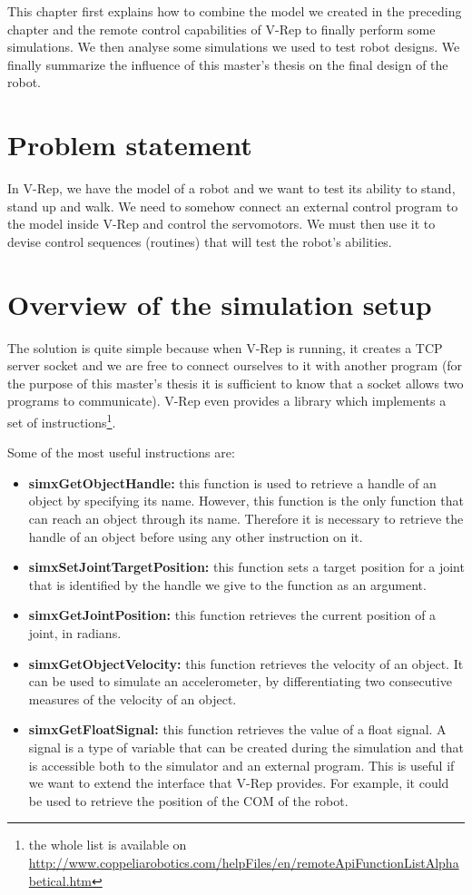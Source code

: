 This chapter first explains how to combine the model we created in the preceding chapter and the remote control capabilities of V-Rep to finally perform some simulations. We then analyse some simulations we used to test robot designs. We finally summarize the influence of this master's thesis on the final design of the robot.

\section{Problem statement}
In V-Rep, we have the model of a robot and we want to test its ability to stand, stand up and walk. We need to somehow connect an external control program to the model inside V-Rep and control the servomotors. We must then use it to devise control sequences (routines) that will test the robot's abilities.

\section{Overview of the simulation setup}
The solution is quite simple because when V-Rep is running, it creates a TCP server socket and we are free to connect ourselves to it with another program (for the purpose of this master's thesis it is sufficient to know that a socket allows two programs to communicate). V-Rep even provides a library which implements a set of instructions\footnote{the whole list is available on \url{http://www.coppeliarobotics.com/helpFiles/en/remoteApiFunctionListAlphabetical.htm}}. 

Some of the most useful instructions are:\begin{itemize}
	\item \textbf{simxGetObjectHandle:} this function is used to retrieve a handle of an object by specifying its name. However, this function is the only function that can reach an object through its name. Therefore it is necessary to retrieve the handle of an object before using any other instruction on it.
	\item \textbf{simxSetJointTargetPosition:} this function sets a target position for a joint that is identified by the handle we give to the function as an argument.
	\item \textbf{simxGetJointPosition:} this function retrieves the current position of a joint, in radians.
	\item \textbf{simxGetObjectVelocity:} this function retrieves the velocity of an object. It can be used to simulate an accelerometer, by differentiating two consecutive measures of the velocity of an object. 
	\item \textbf{simxGetFloatSignal:} this function retrieves the value of a float signal.  A signal is a type of variable that can be created during the simulation and that is accessible both to the simulator and an external program. This is useful if we want to extend the interface that V-Rep provides.  For example, it could be used to retrieve the position of the COM of the robot. 
\end{itemize}

